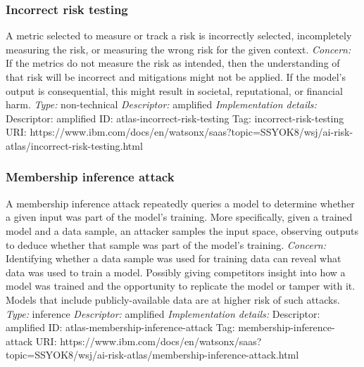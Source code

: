 \documentclass{article}
\begin{document}
\subsubsection*{Incorrect risk testing}
A metric selected to measure or track a risk is incorrectly selected, incompletely measuring the risk, or measuring the wrong risk for the given context.\newline
\textit{Concern: }If the metrics do not measure the risk as intended, then the understanding of that risk will be incorrect and mitigations might not be applied. If the model's output is consequential, this might result in societal, reputational, or financial harm.\newline\newline
\textit{Type: }non-technical\newline
\textit{Descriptor: }amplified \newline\newline
\textit{Implementation details:} \newline
Descriptor: amplified \newline
ID: atlas-incorrect-risk-testing \newline
Tag: incorrect-risk-testing \newline
URI:  https://www.ibm.com/docs/en/watsonx/saas?topic=SSYOK8/wsj/ai-risk-atlas/incorrect-risk-testing.html\newline
\subsubsection*{Membership inference attack}
A membership inference attack repeatedly queries a model to determine whether a given input was part of the model's training. More specifically, given a trained model and a data sample, an attacker samples the input space, observing outputs to deduce whether that sample was part of the model's training. \newline
\textit{Concern: }Identifying whether a data sample was used for training data can reveal what data was used to train a model. Possibly giving competitors insight into how a model was trained and the opportunity to replicate the model or tamper with it. Models that include publicly-available data are at higher risk of such attacks.\newline\newline
\textit{Type: }inference\newline
\textit{Descriptor: }amplified \newline\newline
\textit{Implementation details:} \newline
Descriptor: amplified \newline
ID: atlas-membership-inference-attack \newline
Tag: membership-inference-attack \newline
URI:  https://www.ibm.com/docs/en/watsonx/saas?topic=SSYOK8/wsj/ai-risk-atlas/membership-inference-attack.html\newline
\end{document}

